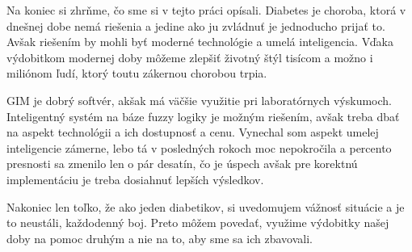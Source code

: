 Na koniec si zhrňme, čo sme si v tejto práci opísali. Diabetes je choroba, ktorá v dnešnej dobe nemá riešenia a jedine ako ju zvládnuť je jednoducho prijať to. Avšak riešením by mohli byť moderné technológie a umelá inteligencia.
Vďaka výdobitkom modernej doby môžeme zlepšiť životný štýl tisícom a možno i miliónom ľudí, ktorý toutu zákernou chorobou trpia.

GIM je dobrý softvér, akšak má väčšie využitie pri laboratórnych výskumoch. Inteligentný systém na báze fuzzy logiky je možným riešením, avšak treba dbať na aspekt technológii a ich dostupnosť a cenu. Vynechal som aspekt umelej inteligencie zámerne, lebo tá v posledných rokoch moc nepokročila a percento presnosti sa zmenilo len o pár desatín, čo je úspech avšak pre korektnú implementáciu je treba dosiahnuť lepších výsledkov.

Nakoniec len toľko, že ako jeden diabetikov, si uvedomujem vážnosť situácie a je to neustáli, každodenný boj.
Preto môžem povedať, využime výdobitky našej doby na pomoc druhým a nie na to, aby sme sa ich zbavovali.